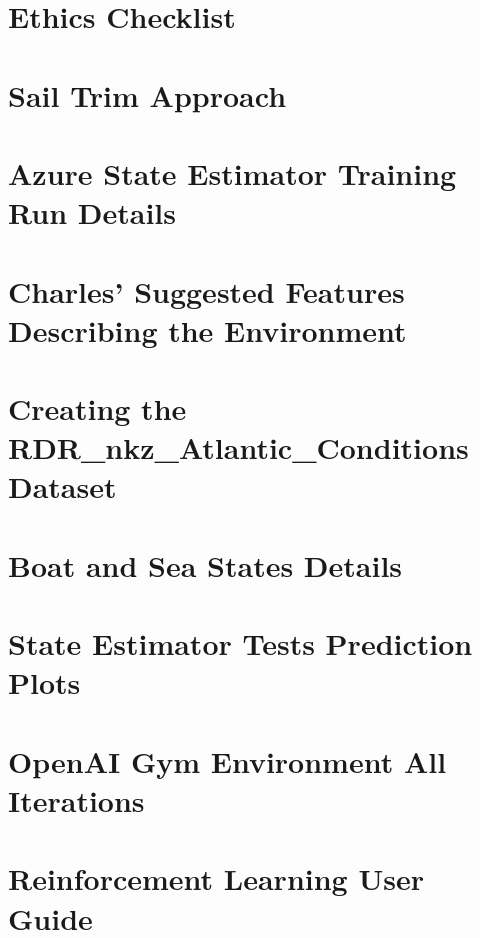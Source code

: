 \documentclass[12pt,twoside]{report}
\begin{document}




\appendix
{}

\chapter{Ethics Checklist}


\chapter{Sail Trim Approach}


\chapter{Azure State Estimator Training Run Details}


\chapter{Charles' Suggested Features Describing the Environment}


\chapter{Creating the RDR\_nkz\_Atlantic\_Conditions Dataset}


\chapter{Boat and Sea States Details}


\chapter{State Estimator Tests Prediction Plots}


\chapter{OpenAI Gym Environment All Iterations}


\chapter{Reinforcement Learning User Guide}

\end{document}
